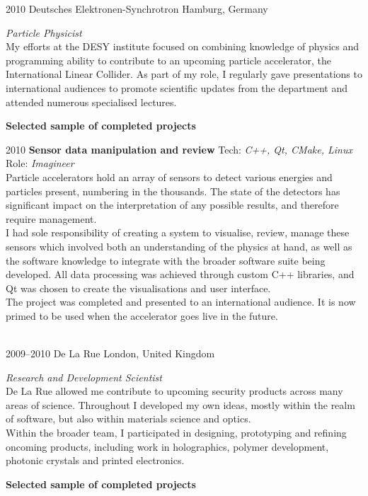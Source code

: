 \documentclass[]{friggeri-cv} %
\begin{document}
\begin{entrylist}
\entry
{2010}
{\LARGE{Deutsches Elektronen-Synchrotron}}
{Hamburg, Germany}
{\emph{Particle Physicist} \\
My efforts at the DESY  institute focused on combining knowledge of physics and programming ability to contribute to an upcoming particle accelerator, the International Linear Collider. As part of my role, I regularly gave presentations to international audiences to promote scientific updates from the department and attended numerous specialised lectures. \\
\centerline{\textbf{Selected sample of completed projects}}} 

\entry
{2010}
{\textbf{Sensor data manipulation and review}}
{}
{Tech: \emph{C++, Qt, CMake, Linux} \hfill Role: \emph{Imagineer} \\
Particle accelerators hold an array of sensors to detect various energies and particles present, numbering in the thousands. The state of the detectors has significant impact on the interpretation of any possible results, and therefore require management.\\
I had sole responsibility of creating a system to visualise, review, manage these sensors which involved both an understanding of the physics at hand, as well as the software knowledge to integrate with the broader software suite being developed. All data processing was achieved through custom C++ libraries, and Qt was chosen to create the visualisations and user interface.\\
The project was completed and presented to an international audience. It is now primed to be used when the accelerator goes live in the future.
}

\\
\entry
{2009--2010}
{\LARGE{De La Rue}}
{London, United Kingdom}
{\emph{Research and Development Scientist} \\
De La Rue allowed me contribute to upcoming security
products across many areas of science. Throughout I developed my own ideas, mostly within the realm of software, but also within materials science and optics. \\
Within the broader team, I participated in designing, prototyping and refining oncoming products, including  work in holographics, polymer development, photonic crystals and printed electronics. \\
\centerline{\textbf{Selected sample of completed projects}}}


\end{entrylist}
\end{document}
